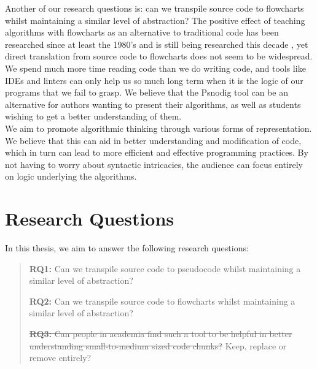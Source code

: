 Another of our research questions is: can we transpile source code to flowcharts whilst maintaining a similar level of abstraction? The positive effect of teaching algorithms with flowcharts as an alternative to traditional code has been researched since at least the 1980's and is still being researched this decade \cite{DBLP:journals/software/Scanlan89}\cite{7096016}\cite{flowchartsHighschool}, yet direct translation from source code to flowcharts does not seem to be widespread. \hfill \\

We spend much more time reading code than we do writing code\cite[14]{martin2008clean}, and tools like IDEs and linters can only help us so much long term when it is the logic of our programs that we fail to grasp. We believe that the Psnodig tool can be an alternative for authors wanting to present their algorithms, as well as students wishing to get a better understanding of them. \hfill \\

We aim to promote algorithmic thinking through various forms of representation. We believe that this can aid in better understanding and modification of code, which in turn can lead to more efficient and effective programming practices. By not having to worry about syntactic intricacies, the audience can focus entirely on logic underlying the algorithms.


\section{Research Questions}

In this thesis, we aim to answer the following research questions: \hfill \\

\begin{quote}
    \textbf{RQ1:} Can we transpile source code to pseudocode whilst maintaining a similar level of abstraction?

    \textbf{RQ2:} Can we transpile source code to flowcharts whilst maintaining a similar level of abstraction?

    \sout{\textbf{RQ3:} Can people in academia find such a tool to be helpful in better understanding small-to-medium sized code chunks?} Keep, replace or remove entirely?
\end{quote}


